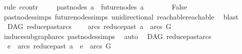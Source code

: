 \begin{isabellebody}
%
\isadelimproof
%
\endisadelimproof
%
\isatagproof
{}\isamarkupfalse%
\ {\isacharparenleft}{\kern0pt}rule\ ccontr{\isacharparenright}{\kern0pt}\isanewline
\ \ \isamarkupfalse%
\ {\isachardoublequoteopen}{\isasymnot}\ past{\isacharunderscore}{\kern0pt}nodes\ a\ {\isasyminter}\ future{\isacharunderscore}{\kern0pt}nodes\ a\ {\isacharequal}{\kern0pt}\ {\isacharbraceleft}{\kern0pt}{\isacharbraceright}{\kern0pt}{\isachardoublequoteclose}\isanewline
\ \ \isamarkupfalse%
\ \isamarkupfalse%
\ False\isanewline
\ \ \ \ \isamarkupfalse%
\ past{\isacharunderscore}{\kern0pt}nodes{\isachardot}{\kern0pt}simps\ future{\isacharunderscore}{\kern0pt}nodes{\isachardot}{\kern0pt}simps\ unidirectional\ reachable{}{\isacharunderscore}{\kern0pt}reachable\ \isamarkupfalse%
\ blast\isanewline
{}\isamarkupfalse%
%
\endisatagproof
{\isafoldproof}%
%
\isadelimproof
%
\endisadelimproof
%
\isadelimdocument
%
\endisadelimdocument
%
\isatagdocument
%
\isamarkuptrue%
%
\endisatagdocument
{\isafolddocument}%
%
\isadelimdocument
%
\endisadelimdocument
{}\isamarkupfalse%
\ {\isacharparenleft}{\kern0pt}\ DAG{\isacharparenright}{\kern0pt}\ reduce{\isacharunderscore}{\kern0pt}past{\isacharunderscore}{\kern0pt}arcs{\isacharcolon}{\kern0pt}\ \isanewline
\ \ \ {\isachardoublequoteopen}arcs\ {\isacharparenleft}{\kern0pt}reduce{\isacharunderscore}{\kern0pt}past\ a{\isacharparenright}{\kern0pt}\ {\isasymsubseteq}\ arcs\ G{\isachardoublequoteclose}\isanewline
%
\isadelimproof
\ \ %
\endisadelimproof
%
\isatagproof
{}\isamarkupfalse%
\ induce{\isacharunderscore}{\kern0pt}subgraph{\isacharunderscore}{\kern0pt}arcs\ past{\isacharunderscore}{\kern0pt}nodes{\isachardot}{\kern0pt}simps\ \isamarkupfalse%
\ auto%
\endisatagproof
{\isafoldproof}%
%
\isadelimproof
\isanewline
%
\endisadelimproof
\isanewline
{}\isamarkupfalse%
\ {\isacharparenleft}{\kern0pt}\ DAG{\isacharparenright}{\kern0pt}\ reduce{\isacharunderscore}{\kern0pt}past{\isacharunderscore}{\kern0pt}arcs{}{\isacharcolon}{\kern0pt}\isanewline
\ \ {\isachardoublequoteopen}e\ {\isasymin}\ arcs\ {\isacharparenleft}{\kern0pt}reduce{\isacharunderscore}{\kern0pt}past\ a{\isacharparenright}{\kern0pt}\ {\isasymLongrightarrow}\ e\ {\isasymin}\ arcs\ G{\isachardoublequoteclose}\isanewline
%
\isadelimproof
\ \ %
\endisadelimproof
%
\isatagproof
{}\isamarkupfalse%

\end{isabellebody}

